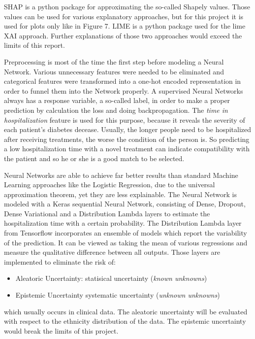 \documentclass[journal]{IEEEtran}
\begin{document}
SHAP is a python package for approximating the so-called Shapely values. Those values can be used for various explanatory approaches, but for this project it is used for plots only like in Figure 7. LIME is a python package used for the lime XAI approach. Further explanations of those two approaches would exceed the limits of this report.
	
Preprocessing is most of the time the first step before modeling a Neural Network. Various unnecessary features were needed to be eliminated and categorical features were transformed into a one-hot encoded representation in order to funnel them into the Network properly. A supervised Neural Networks always has a response variable, a so-called label, in order to make a proper prediction by calculation the loss and doing backpropagation. The \textit{time in hospitalization} feature is used for this purpose, because it reveals the severity of each patient's diabetes decease. Usually, the longer people need to be hospitalized after receiving treatments, the worse the condition of the person is. So predicting a low hospitalization time with a novel treatment can indicate compatibility with the patient and so he or she is a good match to be selected. 

Neural Networks are able to achieve far better results than standard Machine Learning approaches like the Logistic Regression, due to the universal approximation theorem, yet they are less explainable. The Neural Network is modeled with a Keras sequential Neural Network, consisting of Dense, Dropout, Dense Variational and a Distribution Lambda layers to estimate the hospitalization time with a certain probability. The Distribution Lambda layer from Tensorflow incorporates an ensemble of models which report the variability of the prediction. It can be viewed as taking the mean of various regressions and measure the qualitative difference between all outputs. Those layers are implemented to eliminate the risk of: \\

\begin{itemize}
	\item Aleatoric Uncertainty: statisical uncertainty (\textit{known unknowns})
	\item Epistemic Uncertainty systematic uncertainty (\textit{unknown unknowns})\\
\end{itemize}

which usually occurs in clinical data. The aleatoric uncertainty will be evaluated with respect to the ethnicity distribution of the data. The epistemic uncertainty would break the limits of this project.
\end{document}
